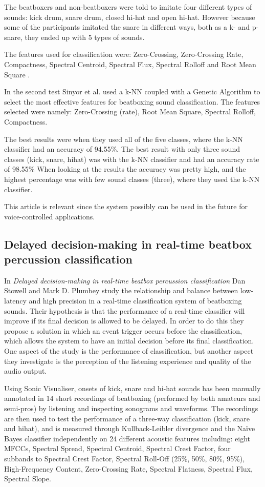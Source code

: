 The beatboxers and non-beatboxers were told to imitate four different types of sounds: kick drum, snare drum, closed hi-hat and open hi-hat. However because some of the participants imitated the snare in different ways, both as a k- and p-snare, they ended up with 5 types of sounds.

The features used for classification were: Zero-Crossing, Zero-Crossing Rate, Compactness, Spectral Centroid, Spectral Flux, Spectral Rolloff and Root Mean Square \citep{Sinyor05}.


In the second test Sinyor et al. \cite{Sinyor05} used a k-NN coupled with a Genetic Algorithm to select the most effective features for beatboxing sound classification. The features selected were namely: Zero-Crossing (rate), Root Mean Square, Spectral Rolloff, Compactness.


The best results were when they used all of the five classes, where the k-NN classifier had an accuracy of 94.55\%. The best result with only three sound classes (kick, snare, hihat) was with the k-NN classifier and had an accuracy rate of 98.55\% 
When looking at the results the accuracy was pretty high, and the highest percentage was with few sound classes (three), where they used the k-NN classifier. 

This article is relevant since the system possibly can be used in the future for voice-controlled applications.

\subsection{Delayed decision-making in real-time beatbox percussion classification}
In \textit{Delayed decision-making in real-time beatbox percussion classification} Dan Stowell and Mark D. Plumbey study the relationship and balance between low-latency and high precision in a real-time classification system of beatboxing sounds. Their hypothesis is that the performance of a real-time classifier will improve if its final decision is allowed to be delayed. 
In order to do this they propose a solution in which an event trigger occurs before the classification, which allows the system to have an initial decision before its final classification. One aspect of the study is the performance of classification, but another aspect they investigate is the perception of the listening experience and quality of the audio output.


Using Sonic Visualiser, onsets of kick, snare and hi-hat sounds has been manually annotated in 14 short recordings of beatboxing (performed by both amateurs and semi-pros) by listening and inspecting sonograms and waveforms. The recordings are then used to test the performance of a three-way classification (kick, snare and hihat), and is measured through Kullback-Leibler divergence and the Naïve Bayes classifier independently on 24 different acoustic features including: eight MFCCs, Spectral Spread, Spectral Centroid, Spectral Crest Factor, four subbands to Spectral Crest Factor, Spectral Roll-Off (25\%, 50\%, 80\%, 95\%), High-Frequency Content, Zero-Crossing Rate, Spectral Flatness, Spectral Flux, Spectral Slope.


